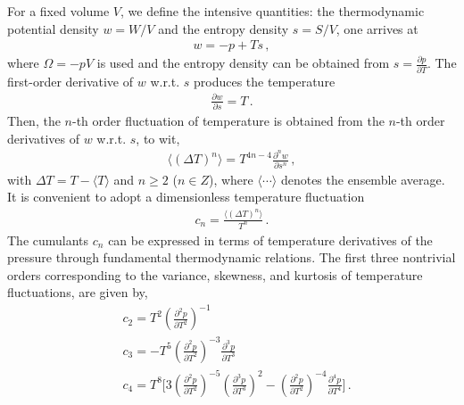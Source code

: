 \documentclass[aps,twocolumn,prd,superscriptaddress,nofootinbib,floatfix]{revtex4-2} %
\begin{document}
For a fixed volume $V$, we define the intensive quantities:  the thermodynamic potential density $w=W/V$ and the entropy density $s=S/V$, one arrives at
\begin{align}
    w=-p+T s\,, \label{}
\end{align}
where $\Omega=-pV$ is used and the entropy density can be obtained from  $s=\frac{\partial p}{\partial T}$. The first-order derivative of $w$ w.r.t. $s$ produces the temperature
\begin{align}
    \frac{\partial w}{\partial s}=T\,. \label{}
\end{align}
Then, the $n$-th order fluctuation of temperature is obtained from the $n$-th order derivatives of $w$ w.r.t. $s$, to wit,
\begin{align}
    \langle(\Delta T)^n \rangle=T^{4n-4}\frac{\partial^n w}{\partial s^n}\,, \label{eq:DeltaTn}
\end{align}
with $\Delta T=T-\langle T \rangle$ and $n\geq 2$ ($n \in Z$), where $\langle \cdots \rangle$ denotes the ensemble average. It is convenient to adopt a dimensionless temperature fluctuation
\begin{align}
    c_n=\frac{\langle(\Delta T)^n \rangle}{T^n}\,. \label{eq:cn}
\end{align}
The cumulants $c_n$ can be expressed in terms of temperature derivatives of the pressure through fundamental thermodynamic relations. The first three nontrivial orders corresponding to the variance, skewness, and kurtosis of temperature fluctuations, are given by,
\begin{equation}\label{eq:c234}\begin{split}
    & c_2=T^2\left(\frac{\partial^2 p}{\partial T^2}\right)^{-1}\,\\[2ex]
    & c_3=-T^5\left(\frac{\partial^2 p}{\partial T^2}\right)^{-3}\frac{\partial^3 p}{\partial T^3}\,\\[2ex]
    & c_4=T^8\Bigg[3\left(\frac{\partial^2 p}{\partial T^2}\right)^{-5}\left(\frac{\partial^3 p}{\partial T^3}\right)^2-\left(\frac{\partial^2 p}{\partial T^2}\right)^{-4}\frac{\partial^4 p}{\partial T^4}\Bigg]\,.
\end{split} 
\end{equation}
\end{document}
